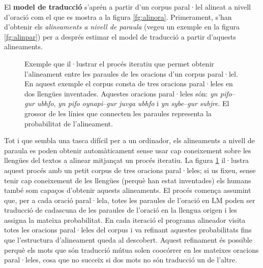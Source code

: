 El \textbf{model de traducció} s'aprén a partir d'un corpus paral·lel
alineat a nivell d'oració com el que es mostra a la figura
\ref{fg:alinora}. Primerament, s'han d'obtenir els \emph{alineaments a
  nivell de paraula} (vegeu un exemple en la figura \ref{fg:alinpar})
per a després estimar el model de traducció a partir d'aquests
alineaments.

\begin{figure}[tb]
  \centering %



  \caption{Exemple que il·lustrar el procés iteratiu que permet
    obtenir l'alineament entre les paraules de les oracions d'un
    corpus paral·lel. En aquest exemple el corpus consta de tres
    oracions paral·leles en dos llengües inventades. Aquestes oracions
    paral·leles són: \emph{yn pifo}--\emph{gur ubhfo}, \emph{yn pifo
      oynapi}--\emph{gur juvga ubhfo} i \emph{yn sybe}--\emph{gur
      subjre}. El grossor de les línies que connecten les paraules
    representa la probabilitat de l'alineament.}
\label{fg:pasosalin}
\end{figure}

Tot i que sembla una tasca difícil per a un ordinador, els alineaments
a nivell de paraula es poden obtenir automàticament sense usar cap
coneixement sobre les llengües del textos a alinear mitjançat un
procés iteratiu. La figura \ref{fg:pasosalin} il·lustra aquest procés
amb un petit corpus de tres oracions paral·leles; si us fixeu, sense
tenir cap coneixement de les llengües (perquè han estat inventades)
els humans també som capaços d'obtenir aquests alineaments. El procés
comença assumint que, per a cada oració paral·lela, totes les paraules
de l'oració en LM poden ser traducció de cadascuna de les paraules de
l'oració en la llengua origen i les assigna la mateixa probabilitat.
En cada iteració el programa alineador visita totes les oracions
paral·leles del corpus i va refinant aquestes probabilitats fins que
l'estructura d'alineament queda al descobert. Aquest refinament és
possible perquè els mots que són traducció mútua solen coocórrer en
les mateixes oracions paral·leles, cosa que no succeïx si dos mots no
són traducció un de l'altre.

